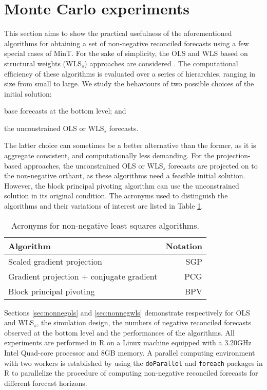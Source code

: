 \documentclass[11pt]{article}
\newcommand{\0}{\phantom{0}}
\begin{document}
\section{Monte Carlo experiments}
\label{sec:MCNN}

This section aims to show the practical usefulness of the aforementioned algorithms for obtaining a set of non-negative reconciled forecasts using a few special cases of MinT. For the sake of simplicity, the OLS and WLS based on structural weights (WLS$_{s}$) approaches are considered \citep{Wick2018}. The computational efficiency of these algorithms is evaluated over a series of hierarchies, ranging in size from small to large. We study the behaviours of two possible choices of the initial solution: \begin{inparaenum}[(i)] \item base forecasts at the bottom level; and \item the unconstrained OLS or WLS$_{s}$ forecasts. \end{inparaenum} The latter choice can sometimes be a better alternative than the former, as it is aggregate consistent, and computationally less demanding. For the projection-based approaches, the unconstrained OLS or WLS$_{s}$ forecasts are projected on to the non-negative orthant, as these algorithms need a feasible initial solution. However, the block principal pivoting algorithm can use the unconstrained solution in its original condition. The acronyms used to distinguish the algorithms and their variations of interest are listed in Table \ref{tbl:acronn}. 

\begin{table}[ht]
	\centering
	
	\caption{Acronyms for non-negative least squares algorithms.}
	\label{tbl:acronn}
		\begin{tabular}{lr}
			\toprule
			Algorithm & Notation \\
			\midrule
			Scaled gradient projection & SGP\\[0.1cm]
			Gradient projection + conjugate gradient & PCG \\[0.1cm]
			Block principal pivoting & BPV \\
			\bottomrule
		\end{tabular}
\end{table}

Sections \ref{sec:nonnegols} and \ref{sec:nonnegwls} demonstrate respectively for OLS and WLS$_{s}$, the simulation design, the numbers of negative reconciled forecasts observed at the bottom level and the performances of the algorithms. All experiments are performed in R on a Linux machine equipped with a 3.20GHz Intel Quad-core processor and 8GB memory. A parallel computing environment with two workers is established by using the \texttt{doParallel} \citep{doparallel2015} and \texttt{foreach} \citep{foreach2015} packages in R to parallelize the procedure of computing non-negative reconciled forecasts for different forecast horizons.  
\end{document}
